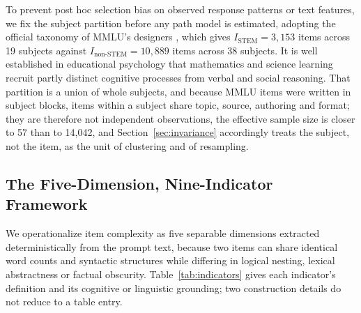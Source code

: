 To prevent post hoc selection bias on observed response patterns or text features, we fix the subject partition before any path model is estimated, adopting the official taxonomy of MMLU's designers \citep{hendrycks2021}, which gives $I_{\text{STEM}} = 3{,}153$ items across 19 subjects against $I_{\text{non-STEM}} = 10{,}889$ items across 38 subjects. It is well established in educational psychology \citep{newcombe2009} that mathematics and science learning recruit partly distinct cognitive processes from verbal and social reasoning. That partition is a union of whole subjects, and because MMLU items were written in subject blocks, items within a subject share topic, source, authoring and format; they are therefore not independent observations, the effective sample size is closer to 57 than to 14,042, and Section~\ref{sec:invariance} accordingly treats the subject, not the item, as the unit of clustering and of resampling.

\subsection{The Five-Dimension, Nine-Indicator Framework}\label{the-five-dimension-nine-indicator-framework}

We operationalize item complexity as five separable dimensions extracted deterministically from the prompt text, because two items can share identical word counts and syntactic structures while differing in logical nesting, lexical abstractness or factual obscurity. Table~\ref{tab:indicators} gives each indicator's definition and its cognitive or linguistic grounding; two construction details do not reduce to a table entry.

